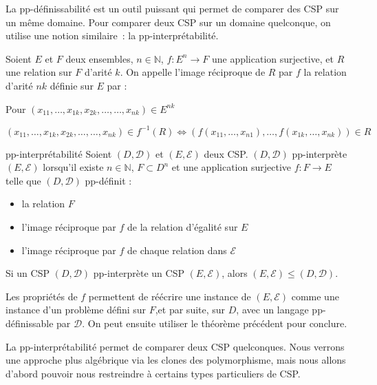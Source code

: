 La pp-définissabilité est un outil puissant qui permet de comparer des CSP sur
un même domaine. Pour comparer deux CSP sur un domaine quelconque, on utilise
une notion similaire~: la pp-interprétabilité.

\begin{defi}{}
    Soient $E$ et $F$ deux ensembles, $n \in \mathbb{N}$, $f : E^n
    \rightarrow F$ une application surjective, et $R$ une relation sur $F$
    d'arité $k$. On appelle l'image réciproque de $R$ par $f$ la relation
    d'arité $nk$ définie sur $E$ par :

    Pour $(x_{11},\dots,x_{1k},x_{2k},\dots,\dots,x_{nk}) \in E^{nk}$

    $$(x_{11},\dots,x_{1k},x_{2k},\dots,\dots,x_{nk}) \in f^{-1}(R) \iff
    (f(x_{11},\dots,x_{n1}),\dots,f(x_{1k},\dots,x_{nk})) \in R$$
\end{defi}

\begin{defi}{pp-interprétabilité}\label{ppInterDef}
    Soient $(D,\mathcal{D})$ et $(E,\mathcal{E})$ deux CSP. $(D,\mathcal{D})$
    pp-interprète $(E,\mathcal{E})$ lorsqu'il existe $n \in \mathbb{N}$, $F
    \subset D^n$ et une application surjective $f : F \rightarrow E$ telle que
    $(D,\mathcal{D})$ pp-définit :
    \begin{itemize}
    	\item la relation $F$
    	\item l'image réciproque par $f$ de la relation d'égalité sur $E$
    	\item l'image réciproque par $f$ de chaque relation dans $\mathcal{E}$
    \end{itemize}
\end{defi}

\begin{theo}{}
    Si un CSP $(D,\mathcal{D})$ pp-interprète un CSP $(E,\mathcal{E})$, alors
    $(E,\mathcal{E}) \leq (D,\mathcal{D})$.
\end{theo}

\begin{pv}
    Les propriétés de $f$ permettent de réécrire une instance de $(E,\mathcal{E})$
    comme une instance d'un problème défini sur $F$,et par suite, sur $D$, avec
    un langage pp-définissable par $\mathcal{D}$. On peut ensuite utiliser le
    théorème précédent pour conclure.
\end{pv}

La pp-interprétabilité permet de comparer deux CSP quelconques. Nous verrons
une approche plus algébrique via les clones des polymorphisme, mais nous allons
d'abord pouvoir nous restreindre à certains types particuliers de CSP.

